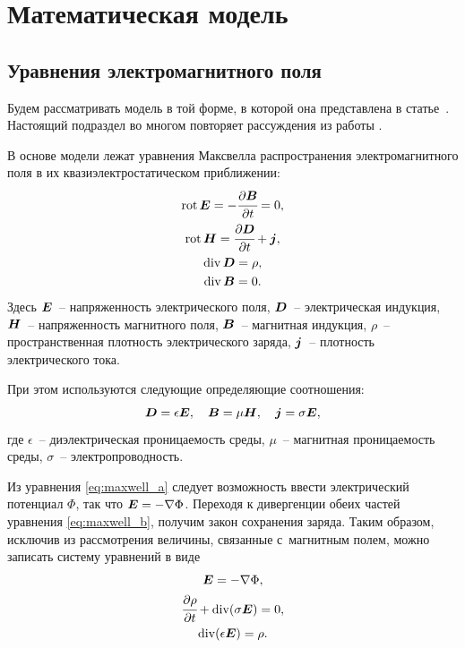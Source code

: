 
\section{Математическая модель}
\label{sec:mathematical_model}

\subsection{Уравнения электромагнитного поля}

Будем рассматривать модель в той форме, в которой она представлена в статье~\cite{zipunova_computational}. Настоящий подраздел во многом повторяет рассуждения из работы \cite{zipunova_conservative}.

В основе модели лежат уравнения Максвелла распространения электромагнитного поля в их квазиэлектростатическом приближении:
\begin{subequations}
\begin{gather}
    \operatorname{{rot}} {\boldsymbol{E}} = -\cfrac{\partial \boldsymbol{B}}{\partial t} = 0,
    \label{eq:maxwell_a} \\
    \operatorname{{rot}} \boldsymbol{H} = \cfrac{\partial {\boldsymbol{D}}}{\partial t} + {\boldsymbol{j}},
    \label{eq:maxwell_b} \\
    \operatorname{{div}} {\boldsymbol{D}} = \rho,
    \label{eq:maxwell_c} \\
    \operatorname{{div}} \boldsymbol{B} = 0.
    \label{eq:maxwell_d}
\end{gather}
\end{subequations}
Здесь ${\boldsymbol{E}}$~-- напряженность электрического поля, ${\boldsymbol{D}}$~-- электрическая индукция, $\boldsymbol{H}$~-- напряженность магнитного поля, $\boldsymbol{B}$~-- магнитная индукция, $\rho$~-- пространственная плотность электрического заряда, ${\boldsymbol{j}}$~-- плотность электрического тока.

При этом используются следующие определяющие соотношения:
\[
    {\boldsymbol{D}} = \epsilon {\boldsymbol{E}}, \quad \boldsymbol{B} = \mu \boldsymbol{H}, \quad {\boldsymbol{j}} = \sigma {\boldsymbol{E}},
\]
где $\epsilon$~-- диэлектрическая проницаемость среды, $\mu$~-- магнитная проницаемость среды, $\sigma$~-- электропроводность.

Из уравнения \eqref{eq:maxwell_a} следует возможность ввести электрический потенциал $\Phi$, так что ${\boldsymbol{E}} = -\nabla \Phi$. Переходя к дивергенции обеих частей уравнения \eqref{eq:maxwell_b}, получим закон сохранения заряда. Таким образом, исключив из рассмотрения величины, связанные с~магнитным полем, можно записать систему уравнений в виде
\begin{subequations}
\begin{gather}
    {\boldsymbol{E}} = -\nabla \Phi,
    \label{eq:electrostatic_a} \\
    \cfrac{\partial \rho}{\partial t} + \operatorname{{div}} (\sigma {\boldsymbol{E}}) = 0,
    \label{eq:electrostatic_b} \\
    \operatorname{{div}} (\epsilon {\boldsymbol{E}}) = \rho.
    \label{eq:electrostatic_c}
\end{gather}
\label{eq:electrostatic}
\end{subequations}

